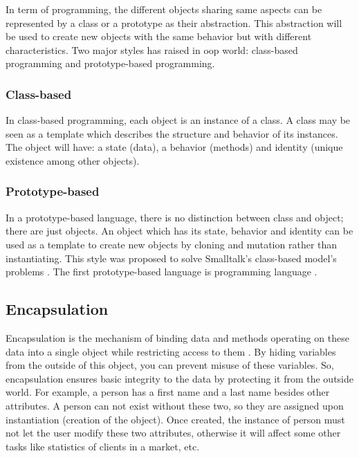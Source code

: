 \documentclass[12pt]{KodeBookAr}
\begin{document}
In term of programming, the different objects sharing same aspects can be represented by a class or a prototype as their abstraction. 
This abstraction will be used to create new objects with the same behavior but with different characteristics. 
Two major styles has raised in \ac{oop} world: class-based programming and prototype-based programming.

\subsubsection{Class-based}

In class-based programming, each object is an instance of a class. 
A class may be seen as a template which describes the structure and behavior of its instances.
The object will have: a state (data), a behavior (methods) and identity (unique existence among other objects).

\subsubsection{Prototype-based}

In a prototype-based language, there is no distinction between class and object; there are just objects. 
An object which has its state, behavior and identity can be used as a template to create new objects by cloning and mutation rather than instantiating.
This style was proposed to solve Smalltalk's class-based model's problems \citep{1986-borning}.
The first prototype-based language is  programming language \citep{1991-ungar}.

\subsection{Encapsulation}

Encapsulation is the mechanism of binding data and methods operating on these data into a single object while restricting access to them \citep{2017-janssen-enc}. 
By hiding variables from the outside of this object, you can prevent misuse of these variables.
So, encapsulation ensures basic integrity to the data by protecting it from the outside world.
For example, a person has a first name and a last name besides other attributes. 
A person can not exist without these two, so they are assigned upon instantiation (creation of the object). 
Once created, the instance of person must not let the user modify these two attributes, otherwise it will affect some other tasks like statistics of clients in a market, etc. 
\end{document}
